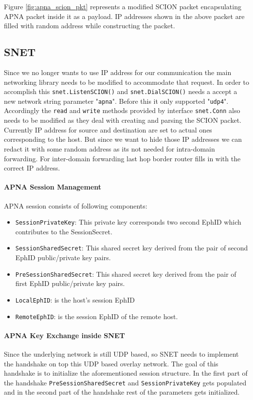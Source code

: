 Figure \ref{fig:apna_scion_pkt} represents a modified SCION packet encapsulating APNA packet inside it as a payload. IP addresses shown in the above packet are filled with random address while constructing the packet.

\subsection{SNET} \label{overlay:snet}
Since we no longer wants to use IP address for our communication the main networking library needs to be modified to accommodate that request. In order to accomplish this \texttt{snet.ListenSCION()} and \texttt{snet.DialSCION()} needs a accept a new network string parameter "\texttt{apna}". Before this it only supported "\texttt{udp4}". Accordingly the \texttt{read} and \texttt{write} methods provided by interface \texttt{snet.Conn} also needs to be modified as they deal with creating and parsing the SCION packet. Currently IP address for source and destination are set to actual ones corresponding to the host. But since we want to hide those IP addresses we can redact it with some random address as its not needed for intra-domain forwarding. For inter-domain forwarding last hop border router fills in with the correct IP address.

\paragraph{APNA Session Management}
APNA session consists of following components:
\begin{itemize}
    \item \texttt{SessionPrivateKey}:  This private key corresponds two second EphID which contributes to the SessionSecret.
    \item \texttt{SessionSharedSecret}: This shared secret key derived from the pair of second EphID public/private key pairs.
    \item \texttt{PreSessionSharedSecret}: This shared secret key derived from the pair of first EphID public/private key pairs.
    \item \texttt{LocalEphID}: is the host's session EphID
    \item \texttt{RemoteEphID}: is the session EphID of the remote host.
\end{itemize}

\paragraph{APNA Key Exchange inside SNET}
Since the underlying network is still UDP based, so SNET needs to implement the handshake on top this UDP based overlay network. The goal of this handshake is to initialize the aforementioned session structure. In the first part of the handshake \texttt{PreSessionSharedSecret} and  \texttt{SessionPrivateKey} gets populated and in the second part of the handshake rest of the parameters gets initialized.


